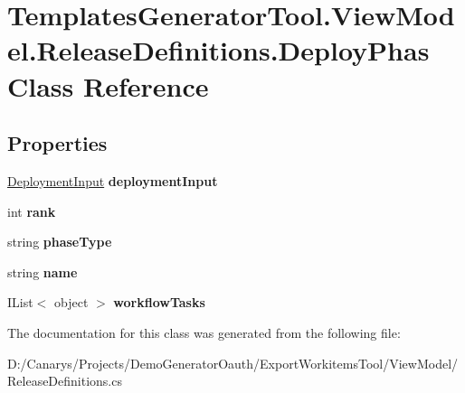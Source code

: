 \hypertarget{class_templates_generator_tool_1_1_view_model_1_1_release_definitions_1_1_deploy_phas}{}\section{Templates\+Generator\+Tool.\+View\+Model.\+Release\+Definitions.\+Deploy\+Phas Class Reference}
\label{class_templates_generator_tool_1_1_view_model_1_1_release_definitions_1_1_deploy_phas}
\subsection*{Properties}
\begin{DoxyCompactItemize}
\item 
\mbox{\label{class_templates_generator_tool_1_1_view_model_1_1_release_definitions_1_1_deploy_phas_a2c4ae32a2630da71b86b6c769784a6c8}} 
\mbox{\hyperlink{class_templates_generator_tool_1_1_view_model_1_1_release_definitions_1_1_deployment_input}{Deployment\+Input}} {\bfseries deployment\+Input}
\item 
\mbox{\label{class_templates_generator_tool_1_1_view_model_1_1_release_definitions_1_1_deploy_phas_a430d7ff43d664e53078451f9dc58aa8d}} 
int {\bfseries rank}
\item 
\mbox{\label{class_templates_generator_tool_1_1_view_model_1_1_release_definitions_1_1_deploy_phas_a937444a75c681d4abf096786af2c5a94}} 
string {\bfseries phase\+Type}
\item 
\mbox{\label{class_templates_generator_tool_1_1_view_model_1_1_release_definitions_1_1_deploy_phas_a830096dfabd9e98b4d4f4cad0e60679b}} 
string {\bfseries name}
\item 
\mbox{\label{class_templates_generator_tool_1_1_view_model_1_1_release_definitions_1_1_deploy_phas_a0f2e296e02cac56b8a41056d6191e7e7}} 
I\+List$<$ object $>$ {\bfseries workflow\+Tasks}
\end{DoxyCompactItemize}


The documentation for this class was generated from the following file\+:\begin{DoxyCompactItemize}
\item 
D\+:/\+Canarys/\+Projects/\+Demo\+Generator\+Oauth/\+Export\+Workitems\+Tool/\+View\+Model/Release\+Definitions.\+cs\end{DoxyCompactItemize}
